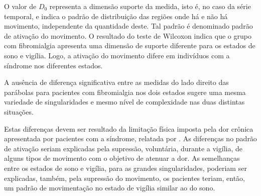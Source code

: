 \documentclass{ufscThesis}
\begin{document}
O valor de $D_{0}$ representa a dimensão suporte da medida, isto é, no caso da série temporal, e indica o padrão de distribuição das regiões onde há e não há movimento, independente da quantidade deste. Tal padrão é denominado padrão de ativação do movimento. O resultado do teste de Wilcoxon indica que o grupo com fibromialgia apresenta uma dimensão de suporte diferente para os estados de sono e vigília. Logo, a ativação do movimento difere em indivíduos com a síndrome nos diferentes estados. \par
A ausência de diferença significativa entre as medidas do lado direito das parábolas para pacientes com fibromialgia nos dois estados sugere uma mesma variedade de singularidades e mesmo nível de complexidade nas duas distintas situações. \par
Estas diferenças devem ser resultado da limitação física imposta pela dor crônica apresentada por pacientes com a síndrome, relatada por . As diferenças no padrão de ativação seriam explicadas pela supressão, voluntária, durante a vigília, de alguns tipos de movimento com o objetivo de atenuar a dor. As semelhanças entre os estados de sono e vigília, para as grandes singularidades, poderiam ser explicadas, também, pela supressão do movimento, os pacientes teriam, então, um padrão de movimentação no estado de vigília similar ao do sono. 
\end{document}
